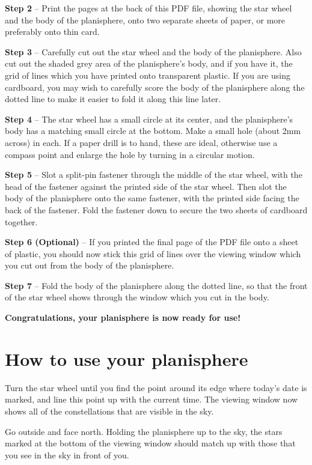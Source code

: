 \documentclass[a4paper,onecolumn,10pt]{article}
\begin{document}
{\bf Step 2} -- Print the pages at the back of this PDF file, showing the
star wheel and the body of the planisphere, onto two separate sheets of paper,
or more preferably onto thin card.

{\bf Step 3} -- Carefully cut out the star wheel and the body of the
planisphere. Also cut out the shaded grey area of the planisphere's body, and
if you have it, the grid of lines which you have printed onto transparent
plastic. If you are using cardboard, you may wish to carefully score the body
of the planisphere along the dotted line to make it easier to fold it along
this line later.

{\bf Step 4} -- The star wheel has a small circle at its center, and the
planisphere's body has a matching small circle at the bottom. Make a small hole
(about 2mm across) in each. If a paper drill is to hand, these are ideal,
otherwise use a compass point and enlarge the hole by turning in a circular
motion.

{\bf Step 5} -- Slot a split-pin fastener through the middle of the
star wheel, with the head of the fastener against the printed side of the
star wheel. Then slot the body of the planisphere onto the same fastener, with
the printed side facing the back of the fastener. Fold the fastener down to
secure the two sheets of cardboard together.

{\bf Step 6 (Optional)} -- If you printed the final page of the PDF file
onto a sheet of plastic, you should now stick this grid of lines over the
viewing window which you cut out from the body of the planisphere.

{\bf Step 7} -- Fold the body of the planisphere along the dotted line,
so that the front of the star wheel shows through the window which you cut in
the body.

{\bf Congratulations, your planisphere is now ready for use!}

\section*{How to use your planisphere}

Turn the star wheel until you find the point around its edge where today's date
is marked, and line this point up with the current time. The viewing window now
shows all of the constellations that are visible in the sky.

Go outside and face north. Holding the planisphere up to the sky, the stars
marked at the bottom of the viewing window should match up with those that you
see in the sky in front of you.
\end{document}

